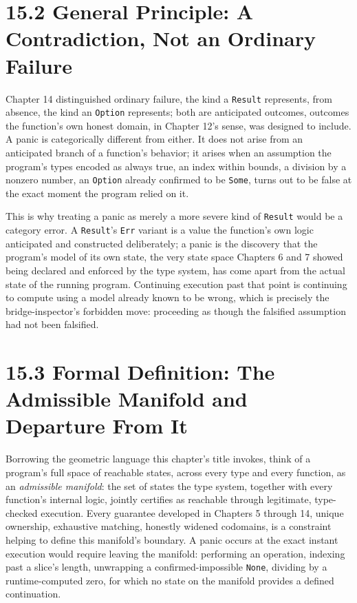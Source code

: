 \documentclass[11pt]{book}
\begin{document}
\section*{15.2 General Principle: A Contradiction, Not an Ordinary Failure}

Chapter 14 distinguished ordinary failure, the kind a \texttt{Result} represents, from absence, the kind an \texttt{Option} represents; both are anticipated outcomes, outcomes the function's own honest domain, in Chapter 12's sense, was designed to include. A panic is categorically different from either. It does not arise from an anticipated branch of a function's behavior; it arises when an assumption the program's types encoded as always true, an index within bounds, a division by a nonzero number, an \texttt{Option} already confirmed to be \texttt{Some}, turns out to be false at the exact moment the program relied on it.

This is why treating a panic as merely a more severe kind of \texttt{Result} would be a category error. A \texttt{Result}'s \texttt{Err} variant is a value the function's own logic anticipated and constructed deliberately; a panic is the discovery that the program's model of its own state, the very state space Chapters 6 and 7 showed being declared and enforced by the type system, has come apart from the actual state of the running program. Continuing execution past that point is continuing to compute using a model already known to be wrong, which is precisely the bridge-inspector's forbidden move: proceeding as though the falsified assumption had not been falsified.

\section*{15.3 Formal Definition: The Admissible Manifold and Departure From It}

Borrowing the geometric language this chapter's title invokes, think of a program's full space of reachable states, across every type and every function, as an \emph{admissible manifold}: the set of states the type system, together with every function's internal logic, jointly certifies as reachable through legitimate, type-checked execution. Every guarantee developed in Chapters 5 through 14, unique ownership, exhaustive matching, honestly widened codomains, is a constraint helping to define this manifold's boundary. A panic occurs at the exact instant execution would require leaving the manifold: performing an operation, indexing past a slice's length, unwrapping a confirmed-impossible \texttt{None}, dividing by a runtime-computed zero, for which no state on the manifold provides a defined continuation.
\end{document}
